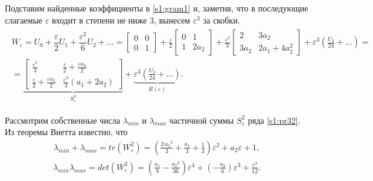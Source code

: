 \documentclass[../main.tex]{subfiles}
\begin{document}
Подставим найденные коэффициенты в \eqref{s1:gram1} и, заметив, что в последующие слагаемые $ \varepsilon $ входит в степени не ниже $ 3 $, вынесем $ \varepsilon^3 $ за скобки.
\begin{gather}\label{s1:pr32}
\begin{gathered}
 W_{\varepsilon} = U_0 + \dfrac{\varepsilon}{2} U_1 + \dfrac{\varepsilon^2}{6}U_2 + \dots = \left[ {\begin{array}{*{20}{c}}
 0&0\\
 0&1
 \end{array}}\right] +\frac{\varepsilon}{2} \left[ {\begin{array}{*{20}{c}}
 0&1\\
 1&2a_2
 \end{array}}\right] +\frac{\varepsilon^2}{3} \left[ {\begin{array}{*{20}{c}}
 2&3a_2\\
 3a_2&2a_1+4a_2^2
 \end{array}}\right] + \varepsilon^3 \left( \frac{U_3}{24} + \dots \right) =
 \\
 = \underbrace{\left[ \begin{array}{*{20}{c}}
 \frac{\varepsilon^2}{3} & \frac{\varepsilon}{2} + \frac{\varepsilon a_2}{2} \\ 
 \frac{\varepsilon}{2} + \frac{\varepsilon a_2}{2} & \frac{\varepsilon^2}{3}(a_1+2a_2) 
 \end{array} \right]}_{S_{\varepsilon}^{2}} + \underbrace{ \varepsilon^3 \left( \frac{U_3}{24} + \dots \right)}_{R(\varepsilon)}.
\end{gathered}
\end{gather}
 
 
Рассмотрим собственные числа $ \lambda_{min} $ и $ \lambda_{max} $ частичной суммы $ S_{\varepsilon}^{2} $ ряда \eqref{s1:pr32}.
Из теоремы Виетта известно, что 
\begin{gather}\label{s1:lambdamax}
 \lambda_{min} + \lambda_{max} = tr(W_{\varepsilon}^{2}) = \left(\frac{2\,{a_{2}}^2}{3}+\frac{a_{1}}{3}+\frac{1}{3}\right)\varepsilon^2+a_{2}\varepsilon+1,
\end{gather}
\begin{gather}\label{s1:lambdamin}
 \lambda_{min} \lambda_{max} = det(W_{\varepsilon}^{2}) = \left(\frac{a_{1}}{9}-\frac{{a_{2}}^2}{36}\right)\varepsilon^4+\left(-\frac{a_{2}}{6}\right)\varepsilon^3+\frac{\varepsilon^2}{12}.
\end{gather}
 
\end{document}
